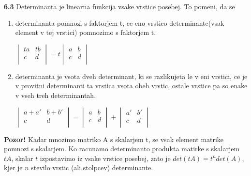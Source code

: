 \documentclass{article}
\begin{document}
\begin{multicols}{4}
\textbf{6.3} Determinanta je linearna funkcija vsake vrstice posebej. To pomeni, da se
\begin{enumerate}
    \item determinanta pomnozi s faktorjem t, ce eno vrstico determinante(vsak element v tej vrstici)
    pomnozimo s faktorjem t.
    \begin{center}
        \begin{math}
            \begin{vmatrix}
                ta & tb\\
                c  & d\\
            \end{vmatrix}
            = t
            \begin{vmatrix}
                a & b\\
                c & d\\
            \end{vmatrix}
        \end{math}
    \end{center}
    \item determinanta je vsota dveh determinant, ki se razlikujeta le v eni vrstici,
    ce je v provitni determinanti ta vrstica vsota obeh vrstic, ostale vrstice pa so enake
    v vseh treh determinantah.
    \begin{center}
        \begin{math}
            \begin{vmatrix}
                a + a' & b + b'\\
                c      &      d\\
            \end{vmatrix} =
            \begin{vmatrix}
                a & b\\
                c & d\\
            \end{vmatrix} +
            \begin{vmatrix}
                a' & b'\\
                c & d\\
            \end{vmatrix}
        \end{math}
    \end{center}
\end{enumerate}

\textbf{Pozor!} Kadar mnozimo matriko A s skalarjem t, se vsak element matrike pomnozi s skalarjem.
Ko racunamo determinanto produkta matirke s skalarjem $tA$, skalar $t$ izpostavimo iz vsake vrstice posebej,
zato je $det(tA) = t^{n}det(A)$, kjer je $n$ stevilo vrstic (ali stolpcev) determinante.


\end{multicols}
\end{document}
